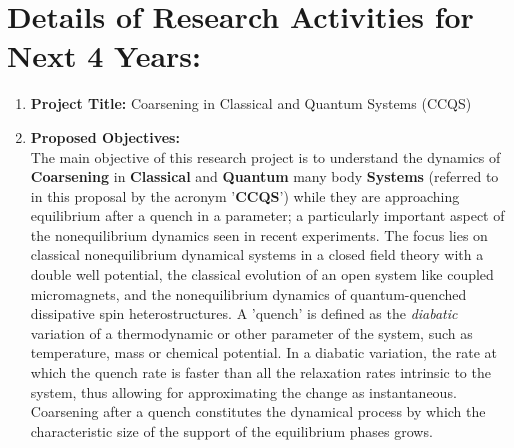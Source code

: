 \documentclass[a4paper,11pt,color]{article}
\def\Acronimo{CCQS}
\begin{document}
\section{Details of Research Activities for Next 4 Years:}
\begin{enumerate}[label=(\alph*)] 
\item 
\textbf{Project Title:} Coarsening in Classical and Quantum Systems (\Acronimo)
\item
\textbf{Proposed Objectives:}\\
The main objective of this research project is to understand the dynamics of \textbf{Coarsening} in \textbf{Classical} and \textbf{Quantum} many body \textbf{Systems} (referred to in this proposal by the acronym '\textbf{CCQS}') while they are approaching equilibrium after a quench in a  {parameter}; a particularly important aspect of the nonequilibrium dynamics seen in recent experiments. The focus lies on classical nonequilibrium dynamical systems in a closed field theory with a double well potential, the classical evolution of an open system like coupled micromagnets, and the nonequilibrium dynamics of quantum-quenched dissipative spin heterostructures. A 'quench' is defined as the \textit{diabatic} variation of a thermodynamic or other  {parameter} of the system, such as temperature, mass or chemical potential. In a diabatic variation, the rate at which the quench rate is faster than all the relaxation rates intrinsic to the system, thus allowing for approximating the change as instantaneous. Coarsening after a quench constitutes the dynamical process by which the characteristic  {size} of the support of the equilibrium phases grows.


\end{enumerate}
\end{document}
